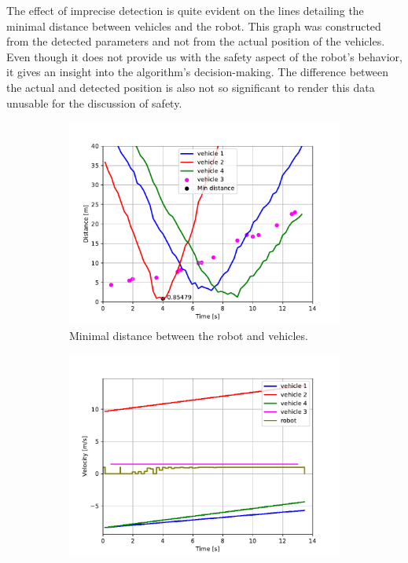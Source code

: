             The effect of imprecise detection is quite evident on the lines detailing the minimal distance between vehicles and the robot. This graph was constructed from the detected parameters and not from the actual position of the vehicles. Even though it does not provide us with the safety aspect of the robot's behavior, it gives an insight into the algorithm's decision-making. The difference between the actual and detected position is also not so significant to render this data unusable for the discussion of safety.\\
            \begin{figure}[H]
                \centering
                \begin{subfigure}{0.49\linewidth}
                    \centering
                    \includegraphics[trim={24 8 40 37}, clip, width=\linewidth]{images/simulations/scene5_dist.pdf}
                    \caption{Minimal distance between the robot and vehicles.}
                \end{subfigure}
                \begin{subfigure}{0.49\linewidth}
                    \centering
                    \includegraphics[trim={21 8 40 37}, clip, width=\linewidth]{images/simulations/scene5_vel.pdf}

\end{subfigure}
\end{figure}
